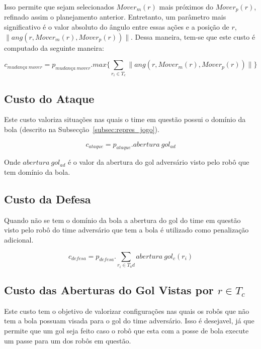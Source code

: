 Isso permite que sejam selecionados $Mover_{m}(r)$ mais próximos do
$Mover_p(r)$, refinado assim o planejamento anterior. Entretanto, um parâmetro
mais significativo é o valor absoluto do ângulo entre essas ações e a posição de
$r$, $\lVert ang(r, Mover_{m}(r), Mover_p(r)) \rVert$.  Dessa maneira, tem-se
que este custo é computado da seguinte maneira:

\begin{dmath}
 c_{mudança{\ }mover} = p_{mudança{\ }mover} .
 max \lbrace \sum_{r_i \in T_c} \lVert ang(r, Mover_{m}(r), Mover_p(r)) \rVert \rbrace
\end{dmath}

\subsection{Custo do Ataque}

Este custo valoriza situações nas quais o time em questão possui o domínio da
bola (descrito na Subsecção~\ref{subsec:repres_jogo}).

\begin{dmath}
 c_{ataque} = p_{ataque} . abertura{\ }gol_{ad}
\end{dmath}

Onde $abertura{\ }gol_{ad}$ é o valor da abertura do gol adversário visto pelo
robô que tem domínio da bola.

\subsection{Custo da Defesa}

Quando não se tem o domínio da bola a abertura do gol do time em questão visto
pelo robô do time adversário que tem a bola é utilizado como penalização
adicional.

\begin{dmath}
  c_{defesa} = p_{defesa} .
   \sum_{r_i \in T_ad} abertura{\ }gol_c(r_i)
\end{dmath}

\subsection{Custo das Aberturas do Gol Vistas por $r\in T_c$}

Este custo tem o objetivo de valorizar configurações nas quais os robôs que não
tem a bola possuam visada para o gol do time adversário.  Isso é desejavel, já
que permite que um gol seja feito caso o robô que esta com a posse de bola
execute um passe para um dos robôs em questão.

